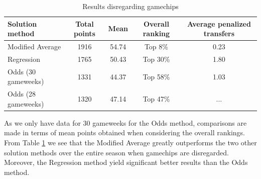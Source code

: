 \begin{table}[H]
\centering
\begin{tabular}{|l|c|c|c|c|}
\hline
Solution method     & Total points & Mean  & Overall ranking & Average penalized transfers \\
\hline
Modified Average    & 1916         & 54.74 & Top 8\%   & 0.23       \\
Regression          & 1765         & 50.43 & Top 30\%  & 1.80      \\
Odds (30 gameweeks) & 1331         & 44.37 & Top 58\%  &
1.03\\
Odds (28 gameweeks) & 1320         & 47.14 & Top 47\%  &
...\\
\hline
\end{tabular}
\caption{Results disregarding gamechips}
\label{tab:res_dis_gamechips}
\end{table}

As we only have data for 30 gameweeks for the Odds method, comparisons are made in terms of mean points obtained when considering the overall rankings. From Table \ref{tab:res_dis_gamechips} we see that the Modified Average greatly outperforms the two other solution methods over the entire season when gamechips are disregarded. Moreover, the Regression method yield significant better results than the Odds method. 

 

